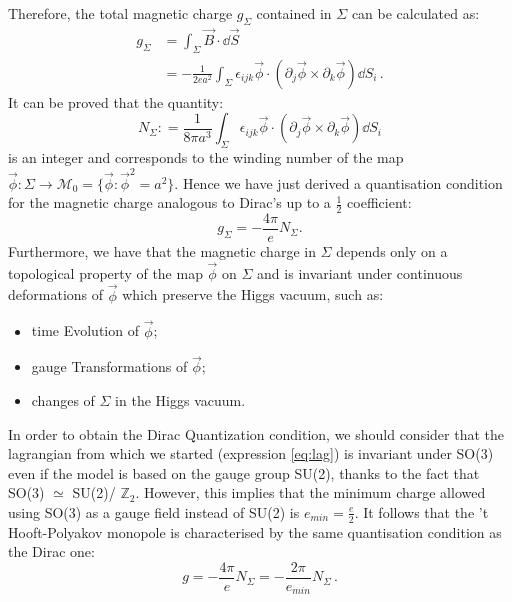 \documentclass[main.tex]{subfiles}
\begin{document}
Therefore, the total magnetic charge $g_\Sigma$ contained in $\Sigma$ can be  calculated as: 
\begin{equation}
\begin{split}
g_\Sigma &= \int_\Sigma \vec{B} \cdot \dd{\vec{S}}  \\
         &= - \frac{1}{2ea^2}\int_\Sigma  \epsilon_{ijk} \vec{\phi} \cdot \left(  \partial_j\vec{\phi} \times \partial_k \vec{\phi}  \right) \dd{S_i}\,.
\end{split}
\end{equation} 
It can be proved that the quantity:
\begin{equation}
N_\Sigma : = \frac{1}{8 \pi a^3} \int_\Sigma  \epsilon_{ijk} \vec{\phi} \cdot \left(  \partial_j\vec{\phi} \times \partial_k \vec{\phi}  \right) \dd{S_i}
\end{equation}
is an integer and corresponds to the winding number of the map $\vec{\phi} \colon \Sigma \to \mathcal{M}_0 = \{ \vec{\phi} : \vec{\phi}^2 = a^2 \}$. 
Hence we have just derived a quantisation condition for the magnetic charge analogous to Dirac's up to a $\frac{1}{2}$ coefficient: 
\begin{equation}
g_\Sigma = -\frac{4 \pi}{e} N_\Sigma.
\end{equation}
Furthermore, we have that the magnetic charge in $\Sigma$ depends only on  a topological property of the map $\vec{\phi}$ on $\Sigma$ and is invariant under continuous deformations of $\vec{\phi}$ which preserve the Higgs vacuum, such as:
\begin{itemize}
    \item time Evolution of $\vec{\phi}$;
    \item gauge Transformations of $\vec{\phi}$;
    \item changes of $\Sigma$ in the Higgs vacuum.
\end{itemize}
In order to obtain the Dirac Quantization condition, we should consider that the lagrangian from which we started (expression \eqref{eq:lag}) is invariant under SO(3) even if the model is based on the gauge group SU(2), thanks to the fact that SO(3) $ \simeq$ SU(2)/ $\mathbb{Z}_2$. However, this implies that the minimum charge allowed using SO(3) as a gauge field instead of SU(2) is $ e_{min} =\frac{e}{2}$.
It follows that the 't Hooft-Polyakov monopole is characterised by the same quantisation condition as the Dirac one: 
\begin{equation}
g = - \frac{4 \pi}{ e} N_\Sigma= - \frac{2 \pi}{ e_{min}} N_\Sigma\,.
\end{equation}
\end{document}
